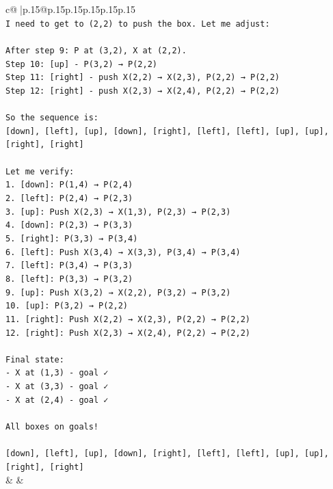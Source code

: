 \documentclass{article}
\begin{document}
{\begin{supertabular}{c@{$\;$}|p{.15\linewidth}@{}p{.15\linewidth}p{.15\linewidth}p{.15\linewidth}p{.15\linewidth}p{.15\linewidth}}
{{{\\ 
\texttt{I need to get to (2,2) to push the box. Let me adjust:} \\
\\ 
\texttt{After step 9: P at (3,2), X at (2,2).} \\
\texttt{Step 10: {[}up{]} {-} P(3,2) → P(2,2)} \\
\texttt{Step 11: {[}right{]} {-} push X(2,2) → X(2,3), P(2,2) → P(2,2)} \\
\texttt{Step 12: {[}right{]} {-} push X(2,3) → X(2,4), P(2,2) → P(2,2)} \\
\\ 
\texttt{So the sequence is:} \\
\texttt{{[}down{]}, {[}left{]}, {[}up{]}, {[}down{]}, {[}right{]}, {[}left{]}, {[}left{]}, {[}up{]}, {[}up{]}, {[}right{]}, {[}right{]}} \\
\\ 
\texttt{Let me verify:} \\
\texttt{1. {[}down{]}: P(1,4) → P(2,4)} \\
\texttt{2. {[}left{]}: P(2,4) → P(2,3)} \\
\texttt{3. {[}up{]}: Push X(2,3) → X(1,3), P(2,3) → P(2,3)} \\
\texttt{4. {[}down{]}: P(2,3) → P(3,3)} \\
\texttt{5. {[}right{]}: P(3,3) → P(3,4)} \\
\texttt{6. {[}left{]}: Push X(3,4) → X(3,3), P(3,4) → P(3,4)} \\
\texttt{7. {[}left{]}: P(3,4) → P(3,3)} \\
\texttt{8. {[}left{]}: P(3,3) → P(3,2)} \\
\texttt{9. {[}up{]}: Push X(3,2) → X(2,2), P(3,2) → P(3,2)} \\
\texttt{10. {[}up{]}: P(3,2) → P(2,2)} \\
\texttt{11. {[}right{]}: Push X(2,2) → X(2,3), P(2,2) → P(2,2)} \\
\texttt{12. {[}right{]}: Push X(2,3) → X(2,4), P(2,2) → P(2,2)} \\
\\ 
\texttt{Final state:} \\
\texttt{{-} X at (1,3) {-} goal ✓} \\
\texttt{{-} X at (3,3) {-} goal ✓} \\
\texttt{{-} X at (2,4) {-} goal ✓} \\
\\ 
\texttt{All boxes on goals!} \\
\\ 
\texttt{{[}down{]}, {[}left{]}, {[}up{]}, {[}down{]}, {[}right{]}, {[}left{]}, {[}left{]}, {[}up{]}, {[}up{]}, {[}right{]}, {[}right{]}} \\
            }
        }
    }
    & & \\ \\


\end{supertabular}}
\end{document}
